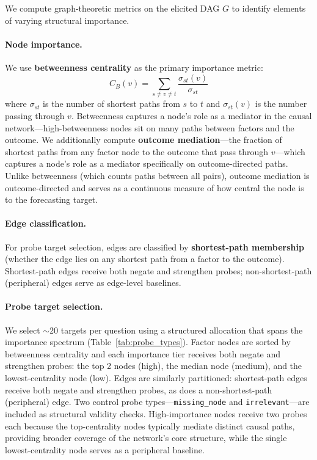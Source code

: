 \documentclass[11pt]{article}
\begin{document}
We compute graph-theoretic metrics on the elicited DAG $G$ to identify elements of varying structural importance.

\paragraph{Node importance.} We use \textbf{betweenness centrality} as the primary importance metric:
\begin{equation}
    C_B(v) = \sum_{s \neq v \neq t} \frac{\sigma_{st}(v)}{\sigma_{st}}
\end{equation}
where $\sigma_{st}$ is the number of shortest paths from $s$ to $t$ and $\sigma_{st}(v)$ is the number passing through $v$. Betweenness captures a node's role as a mediator in the causal network---high-betweenness nodes sit on many paths between factors and the outcome. We additionally compute \textbf{outcome mediation}---the fraction of shortest paths from any factor node to the outcome that pass through $v$---which captures a node's role as a mediator specifically on outcome-directed paths. Unlike betweenness (which counts paths between all pairs), outcome mediation is outcome-directed and serves as a continuous measure of how central the node is to the forecasting target.

\paragraph{Edge classification.} For probe target selection, edges are classified by \textbf{shortest-path membership} (whether the edge lies on any shortest path from a factor to the outcome). Shortest-path edges receive both negate and strengthen probes; non-shortest-path (peripheral) edges serve as edge-level baselines.

\paragraph{Probe target selection.} We select ${\sim}$20 targets per question using a structured allocation that spans the importance spectrum (Table~\ref{tab:probe_types}). Factor nodes are sorted by betweenness centrality and each importance tier receives both negate and strengthen probes: the top 2 nodes (high), the median node (medium), and the lowest-centrality node (low). Edges are similarly partitioned: shortest-path edges receive both negate and strengthen probes, as does a non-shortest-path (peripheral) edge. Two control probe types---\texttt{missing\_node} and \texttt{irrelevant}---are included as structural validity checks. High-importance nodes receive two probes each because the top-centrality nodes typically mediate distinct causal paths, providing broader coverage of the network's core structure, while the single lowest-centrality node serves as a peripheral baseline.
\end{document}
